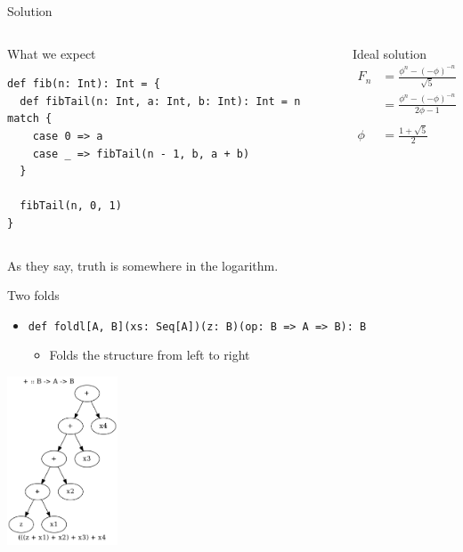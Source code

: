 \documentclass[presentation,aspectratio=169,smaller]{beamer}
\begin{document}
\begin{frame}[label={sec:org8a0458a},fragile]{Solution}
 \begin{columns}
\begin{column}[t]{0.5\columnwidth}
\begin{block}{What we expect}
\begin{verbatim}
def fib(n: Int): Int = {
  def fibTail(n: Int, a: Int, b: Int): Int = n match {
    case 0 => a
    case _ => fibTail(n - 1, b, a + b)
  }

  fibTail(n, 0, 1)
}
\end{verbatim}

\pause
\end{block}
\end{column}

\begin{column}[t]{0.5\columnwidth}
\begin{block}{Ideal solution}
\begin{align*}
  F_n &= \frac {\phi ^ n - {(- \phi)}^{-n}} {\sqrt{5}} \\
  &= \frac {\phi ^ n - {(- \phi)}^{-n}} {2\phi - 1} \\
  \\
  \phi &= \frac {1 + \sqrt{5}}{2}
\end{align*}

\pause
\end{block}
\end{column}
\end{columns}

As they say, truth is somewhere in the logarithm.
\end{frame}

\begin{frame}[label={sec:orgd7987ae},fragile]{Two folds}
 \begin{itemize}
\item \texttt{def foldl[A, B](xs: Seq[A])(z: B)(op: B => A => B): B}
\begin{itemize}
\item Folds the structure from left to right
\end{itemize}
\end{itemize}

\pause

\begin{center}
\includegraphics[height=5cm]{.dot/foldl-1.png}
\end{center}
\end{frame}
\end{document}
